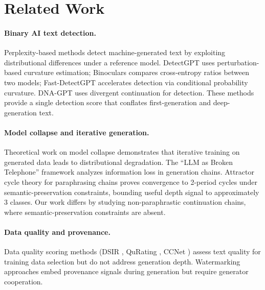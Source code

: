 \documentclass[11pt,a4paper]{article}
\begin{document}
\section{Related Work}

\paragraph{Binary AI text detection.} Perplexity-based methods detect machine-generated text by exploiting distributional differences under a reference model. DetectGPT \citep{mitchell2023detectgpt} uses perturbation-based curvature estimation; Binoculars \citep{hans2024binoculars} compares cross-entropy ratios between two models; Fast-DetectGPT \citep{bao2024fastdetectgpt} accelerates detection via conditional probability curvature. DNA-GPT \citep{yang2024dnagpt} uses divergent continuation for detection. These methods provide a single detection score that conflates first-generation and deep-generation text.

\paragraph{Model collapse and iterative generation.} Theoretical work on model collapse \citep{shumailov2024model,alemohammad2023selfconsuming,dohmatob2024model,gerstgrasser2024model} demonstrates that iterative training on generated data leads to distributional degradation. The ``LLM as Broken Telephone'' framework \citep{brokentel2025} analyzes information loss in generation chains. Attractor cycle theory for paraphrasing chains \citep{attractor2025} proves convergence to 2-period cycles under semantic-preservation constraints, bounding useful depth signal to approximately 3 classes. Our work differs by studying non-paraphrastic continuation chains, where semantic-preservation constraints are absent.

\paragraph{Data quality and provenance.} Data quality scoring methods (DSIR \citep{xie2023dsir}, QuRating \citep{wettig2024qurating}, CCNet \citep{wenzek2020ccnet}) assess text quality for training data selection but do not address generation depth. Watermarking approaches \citep{kirchenbauer2023watermark} embed provenance signals during generation but require generator cooperation.
\end{document}
